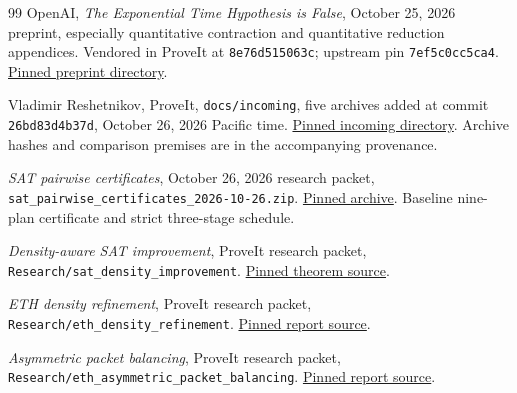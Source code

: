 \clearpage
{}
\begin{thebibliography}{99}
\small
{}
OpenAI, \emph{The Exponential Time Hypothesis is False}, October 25,
2026 preprint, especially quantitative contraction and quantitative
reduction appendices. Vendored in ProveIt at
\texttt{8e76d515063c}; upstream pin \texttt{7ef5c0cc5ca4}.
\href{https://github.com/VladimirReshetnikov/ProveIt/tree/8e76d515063c4b9fbd8743a846b457e3a01bc039/lib/openai-math/preprints/The-Exponential-Time-Hypothesis-is-False-October-25-2026}{Pinned preprint directory}.

Vladimir Reshetnikov, ProveIt, \texttt{docs/incoming}, five archives added
at commit \texttt{26bd83d4b37d}, October 26, 2026 Pacific time.
\href{https://github.com/VladimirReshetnikov/ProveIt/tree/8e76d515063c4b9fbd8743a846b457e3a01bc039/docs/incoming}{Pinned incoming directory}.
Archive hashes and comparison premises are in the accompanying provenance.

\emph{SAT pairwise certificates}, October 26, 2026 research packet,
\texttt{sat\_pairwise\_certificates\_2026-10-26.zip}.
\href{https://github.com/VladimirReshetnikov/ProveIt/blob/8e76d515063c4b9fbd8743a846b457e3a01bc039/docs/incoming/sat_pairwise_certificates_2026-10-26.zip}{Pinned archive}.
Baseline nine-plan certificate and strict three-stage schedule.

\emph{Density-aware SAT improvement}, ProveIt research packet,
\texttt{Research/sat\_density\_improvement}.
\href{https://github.com/VladimirReshetnikov/ProveIt/blob/8e76d515063c4b9fbd8743a846b457e3a01bc039/Computability/SubexponentialSAT/Research/sat_density_improvement/density_aware_sat_improvement.tex}{Pinned theorem source}.

\emph{ETH density refinement}, ProveIt research packet,
\texttt{Research/eth\_density\_refinement}.
\href{https://github.com/VladimirReshetnikov/ProveIt/blob/8e76d515063c4b9fbd8743a846b457e3a01bc039/Computability/SubexponentialSAT/Research/eth_density_refinement/report.tex}{Pinned report source}.

\emph{Asymmetric packet balancing}, ProveIt research packet,
\nolinkurl{Research/eth_asymmetric_packet_balancing}.
\href{https://github.com/VladimirReshetnikov/ProveIt/blob/8e76d515063c4b9fbd8743a846b457e3a01bc039/Computability/SubexponentialSAT/Research/eth_asymmetric_packet_balancing/report.tex}{Pinned report source}.


\end{thebibliography}
